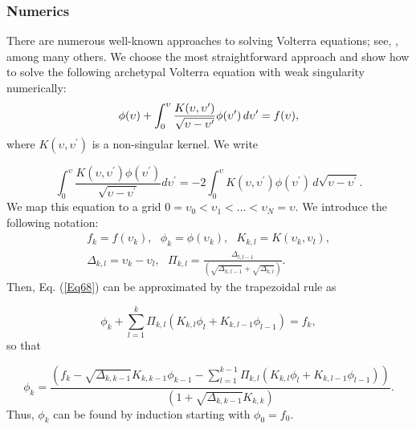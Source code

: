 \documentclass{article}
\begin{document}
\subsubsection{Numerics}

There are numerous well-known approaches to solving Volterra equations; see, 
\cite{Linz1985}, among many others. We choose the most straightforward
approach and show how to solve the following archetypal Volterra equation
with weak singularity numerically: 
\begin{equation}
\phi (\upsilon )+\int_{0}^{\upsilon }\frac{K(\upsilon ,\upsilon ^{\prime })}{%
\sqrt{\upsilon -\upsilon ^{\prime }}}\phi (\upsilon ^{\prime })\,d\upsilon
^{\prime }=f(\upsilon ),  \label{Eq68}
\end{equation}%
where $K(\upsilon ,\upsilon ^{\prime })$ is a non-singular kernel. We write

\begin{equation}
\int_{0}^{\upsilon }\frac{K(\upsilon ,\upsilon ^{\prime })\phi \left(
\upsilon ^{\prime }\right) }{\sqrt{\upsilon -\upsilon ^{\prime }}}d\upsilon
^{\prime }=-2\int_{0}^{\upsilon }K(\upsilon ,\upsilon ^{\prime })\phi \left(
\upsilon ^{\prime }\right) \,d\sqrt{\upsilon -\upsilon ^{\prime }}.
\label{Eq69}
\end{equation}%
We map this equation to a grid $0=\upsilon _{0}<\upsilon _{1}<\ldots
<\upsilon _{N}=\upsilon $. We introduce the following notation: 
\begin{equation}
\begin{array}{c}
f_{k}=f(\upsilon _{k}),\ \ \ \phi _{k}=\phi \left( \upsilon _{k}\right) ,\ \
\ K_{k,l}=K(\upsilon _{k},\upsilon _{l}), \\ 
\Delta _{k,l}=\upsilon _{k}-\upsilon _{l},\ \ \ \Pi _{k,l}=\frac{\Delta
_{l,l-1}}{\left( \sqrt{\Delta _{k,l-1}}+\sqrt{\Delta _{k,l}}\right) }.%
\end{array}
\label{Eq70}
\end{equation}%
Then, Eq. (\ref{Eq68}) can be approximated by the trapezoidal rule as

\begin{equation}
\phi _{k}+\sum_{l=1}^{k}\Pi _{k,l}\left( K_{k,l}\phi _{l}+K_{k,l-1}\phi
_{l-1}\right) =f_{k},  \label{Eq71}
\end{equation}%
so that

\begin{equation}
\phi _{k}=\frac{\left( f_{k}-\sqrt{\Delta _{k,k-1}}K_{k,k-1}\phi
_{k-1}-\sum_{l=1}^{k-1}\Pi _{k,l}\left( K_{k,l}\phi _{l}+K_{k,l-1}\phi
_{l-1}\right) \right) }{\left( 1+\sqrt{\Delta _{k,k-1}}K_{k,k}\right) }.
\label{Eq72}
\end{equation}%
Thus, $\phi _{k}$ can be found by induction starting with $\phi _{0}=f_{0}$.
\end{document}
